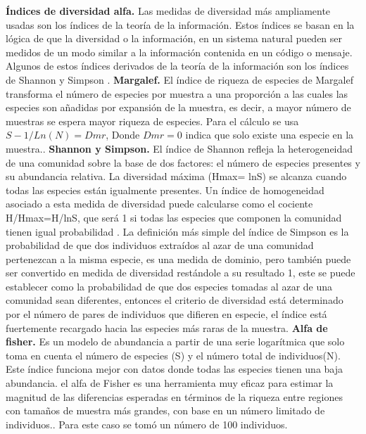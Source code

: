 \documentclass[conference,final,12pt,]{IEEEtran}
\begin{document}
\textbf{Índices de diversidad alfa.} Las medidas de diversidad más
ampliamente usadas son los índices de la teoría de la información. Estos
índices se basan en la lógica de que la diversidad o la información, en
un sistema natural pueden ser medidos de un modo similar a la
información contenida en un código o mensaje. Algunos de estos índices
derivados de la teoría de la información son los índices de Shannon y
Simpson \citep{B}. \textbf{Margalef.} El índice de riqueza de especies de
Margalef transforma el número de especies por muestra a una proporción a
las cuales las especies son añadidas por expansión de la
muestra\citep{N}, es decir, a mayor número de muestras se espera mayor
riqueza de especies. Para el cálculo se usa \(S-1/Ln(N)=Dmr\), Donde
\(Dmr=0\) indica que solo existe una especie en la muestra.\citep{N}.
\textbf{Shannon y Simpson.} El índice de Shannon refleja la
heterogeneidad de una comunidad sobre la base de dos factores: el número
de especies presentes y su abundancia relativa. La diversidad máxima
(Hmax= lnS) se alcanza cuando todas las especies están igualmente
presentes. Un índice de homogeneidad asociado a esta medida de
diversidad puede calcularse como el cociente H/Hmax=H/lnS, que será 1 si
todas las especies que componen la comunidad tienen igual probabilidad
\citep{L}. La definición más simple del índice de Simpson es la
probabilidad de que dos individuos extraídos al azar de una comunidad
pertenezcan a la misma especie\citep{K}, es una medida de dominio, pero
también puede ser convertido en medida de diversidad restándole a su
resultado 1, este se puede establecer como la probabilidad de que dos
especies tomadas al azar de una comunidad sean diferentes, entonces el
criterio de diversidad está determinado por el número de pares de
individuos que difieren en especie\citep{M}, el índice está fuertemente
recargado hacia las especies más raras de la muestra\citep{B}.
\textbf{Alfa de fisher.} Es un modelo de abundancia a partir de una
serie logarítmica que solo toma en cuenta el número de especies (S) y el
número total de individuos(N)\citep{P}. Este índice funciona mejor con
datos donde todas las especies tienen una baja abundancia\citep{Q}. el
alfa de Fisher es una herramienta muy eficaz para estimar la magnitud de
las diferencias esperadas en términos de la riqueza entre regiones con
tamaños de muestra más grandes, con base en un número limitado de
individuos.\citep{R}. Para este caso se tomó un número de 100 individuos.
\end{document}

